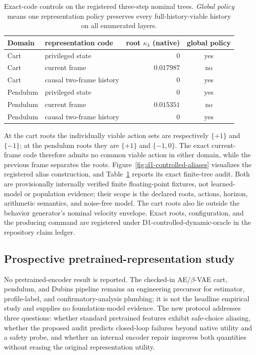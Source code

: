 \begin{table}[H]
\centering
\small
\caption{Exact-code controls on the registered three-step nominal trees.  \emph{Global policy}
means one representation policy preserves every full-history-viable history on all enumerated layers.}
\label{tab:dynamic-controls}
\begin{tabular}{@{}llrc@{}}
\toprule
Domain & representation code & root $\kappa_3$ (native) & global policy \\
\midrule
Cart & privileged state & $0$ & yes \\
Cart & current frame & $0.017987$ & no \\
Cart & causal two-frame history & $0$ & yes \\
Pendulum & privileged state & $0$ & yes \\
Pendulum & current frame & $0.015351$ & no \\
Pendulum & causal two-frame history & $0$ & yes \\
\bottomrule
\end{tabular}
\end{table}

At the cart roots the individually viable action sets are respectively $\{+1\}$ and $\{-1\}$;
at the pendulum roots they are $\{+1\}$ and $\{-1,0\}$.  The exact current-frame code therefore
admits no common viable action in either domain, while the previous frame separates the roots.
Figure~\ref{fig:d1-controlled-aliases} visualizes the registered alias construction, and
Table~\ref{tab:dynamic-controls} reports its exact finite-tree audit.  Both are provisionally
internally verified finite floating-point
fixtures, not learned-model or population evidence; their scope is the declared roots, actions,
horizon, arithmetic semantics, and noise-free model.  The
cart roots also lie outside the behavior generator's nominal velocity envelope.  Exact roots,
configuration, and the producing command are registered under D1-controlled-dynamic-oracle in the
repository claim ledger.

\subsection{Prospective pretrained-representation study}
\label{sec:prospective-study}

No pretrained-encoder result is reported.  The checked-in AE/$\beta$-VAE cart, pendulum, and Dubins
pipeline remains an engineering precursor for estimator, profile-label, and confirmatory-analysis
plumbing; it is not the headline empirical study and supplies no foundation-model evidence.  The
new protocol addresses three questions: whether standard pretrained features exhibit safe-choice
aliasing, whether the proposed audit predicts closed-loop failures beyond native utility and a
safety probe, and whether an internal encoder repair improves both quantities without erasing the
original representation utility.


